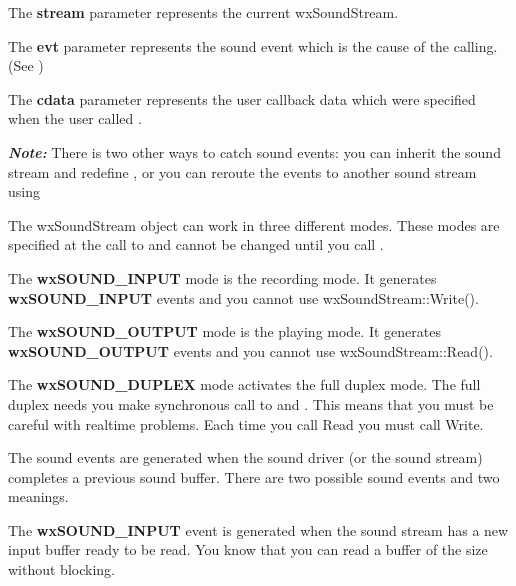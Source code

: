 The {\bf stream} parameter represents the current wxSoundStream.

The {\bf evt} parameter represents the sound event which is the cause of the calling. (See )

The {\bf cdata} parameter represents the user callback data which were specified
when the user called .

{\bf\it Note:} There is two other ways to catch sound events: you can inherit the
sound stream and redefine , or you can reroute the events to another sound stream using 



The wxSoundStream object can work in three different modes. These modes are specified
at the call to 
and cannot be changed until you call
.

The {\bf wxSOUND\_INPUT} mode is the recording mode. It generates {\bf wxSOUND\_INPUT}
events and you cannot use wxSoundStream::Write().

The {\bf wxSOUND\_OUTPUT} mode is the playing mode. It generates {\bf wxSOUND\_OUTPUT}
events and you cannot use wxSoundStream::Read().

The {\bf wxSOUND\_DUPLEX} mode activates the full duplex mode. The full duplex needs
you make synchronous call to  and
. This means that you must be
careful with realtime problems. Each time you call Read you must call Write.



The sound events are generated when the sound driver (or the sound stream) completes
a previous sound buffer. There are two possible sound events and two meanings.

The {\bf wxSOUND\_INPUT} event is generated when the sound stream has a new input
buffer ready to be read. You know that you can read a buffer of the size
 without blocking. 

